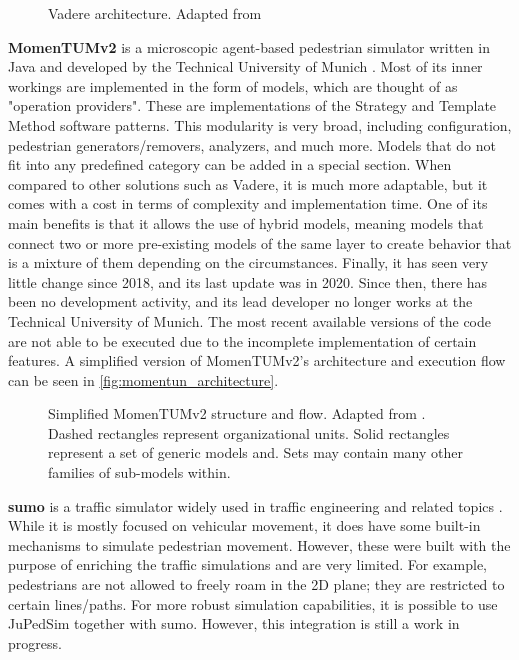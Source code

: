\documentclass[twoside, 11pt]{article}
\begin{document}
\begin{figure}[h]
  \centering
  
  \caption[Vadere architecture]{Vadere architecture. Adapted from \cite{seitzSuperpositionPrincipleConceptual2016}}
  \label{fig:vadere_architecture}
\end{figure}

\textbf{MomenTUMv2} is a microscopic agent-based pedestrian simulator written in Java and developed by the Technical University of Munich \cite{kielarMomenTUMv2ModularExtensible2016}. Most of its inner workings are implemented in the form of models, which are thought of as "operation providers". These are implementations of the Strategy and Template Method software patterns. This modularity is very broad, including configuration, pedestrian generators/removers, analyzers, and much more. Models that do not fit into any predefined category can be added in a special section. When compared to other solutions such as Vadere, it is much more adaptable, but it comes with a cost in terms of complexity and implementation time. One of its main benefits is that it allows the use of hybrid models, meaning models that connect two or more pre-existing models of the same layer to create behavior that is a mixture of them depending on the circumstances. Finally, it has seen very little change since 2018, and its last update was in 2020. Since then, there has been no development activity, and its lead developer no longer works at the Technical University of Munich. The most recent available versions of the code are not able to be executed due to the incomplete implementation of certain features. A simplified version of MomenTUMv2's architecture and execution flow can be seen in \autoref{fig:momentun_architecture}.

\begin{figure}[h]
  \centering
  
  \caption[Simplified MomenTUMv2 structure and flow]{Simplified MomenTUMv2 structure and flow. Adapted from \cite{kielarMomenTUMv2ModularExtensible2016}. Dashed rectangles represent organizational units. Solid rectangles represent a set of generic models and. Sets may contain many other families of sub-models within.}
  \label{fig:momentun_architecture}
\end{figure}

\textbf{\gls{sumo}} is a traffic simulator widely used in traffic engineering and related topics \cite{SUMO2018}. While it is mostly focused on vehicular movement, it does have some built-in mechanisms to simulate pedestrian movement. However, these were built with the purpose of enriching the traffic simulations and are very limited. For example, pedestrians are not allowed to freely roam in the 2D plane; they are restricted to certain lines/paths. For more robust simulation capabilities, it is possible to use JuPedSim together with \gls{sumo}. However, this integration is still a work in progress.
\end{document}
